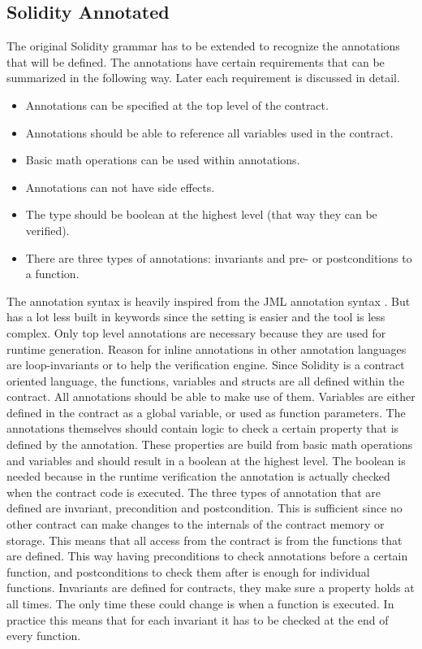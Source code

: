 \documentclass[a4paper]{article}
\begin{document}
\subsection{Solidity Annotated}
The original Solidity grammar has to be extended to recognize the annotations that will be defined. The annotations have certain requirements that can be summarized in the following way. Later each requirement is discussed in detail.
\begin{itemize}
    \item Annotations can be specified at the top level of the contract.
    \item Annotations should be able to reference all variables used in the contract.
    \item Basic math operations can be used within annotations.
    \item Annotations can not have side effects.
    \item The type should be boolean at the highest level (that way they can be verified).
    \item There are three types of annotations: invariants and pre- or postconditions to a function.
\end{itemize}

The annotation syntax is heavily inspired from the JML annotation syntax \cite{leavens2008jml}. But has a lot less built in keywords since the setting is easier and the tool is less complex. 
Only top level annotations are necessary because they are used for runtime generation. Reason for inline annotations in other annotation languages are loop-invariants or to help the verification engine. Since Solidity is a contract oriented language, the functions, variables and structs are all defined within the contract. All annotations should be able to make use of them. Variables are either defined in the contract as a global variable, or used as function parameters. The annotations themselves should contain logic to check a certain property that is defined by the annotation. These properties are build from basic math operations and variables and should result in a boolean at the highest level. The boolean is needed because in the runtime verification the annotation is actually checked when the contract code is executed. The three types of annotation that are defined are invariant, precondition and postcondition. This is sufficient since no other contract can make changes to the internals of the contract memory or storage. This means that all access from the contract is from the functions that are defined. This way having preconditions to check annotations before a certain function, and postconditions to check them after is enough for individual functions. Invariants are defined for contracts, they make sure a property holds at all times. The only time these could change is when a function is executed. In practice this means that for each invariant it has to be checked at the end of every function.
\end{document}
